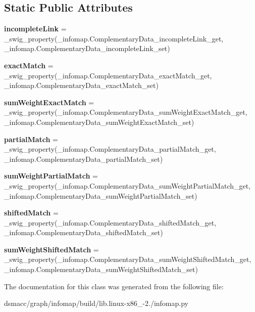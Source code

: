 \subsection*{Static Public Attributes}
\begin{DoxyCompactItemize}
\item 
\mbox{\label{classinfomap_1_1ComplementaryData_aebe64da5d2e6677b2fb473d45c24344f}} 
{\bfseries incomplete\+Link} = \+\_\+swig\+\_\+property(\+\_\+infomap.\+Complementary\+Data\+\_\+incomplete\+Link\+\_\+get, \+\_\+infomap.\+Complementary\+Data\+\_\+incomplete\+Link\+\_\+set)
\item 
\mbox{\label{classinfomap_1_1ComplementaryData_a3b9efed9447db9774af345a5d88b3758}} 
{\bfseries exact\+Match} = \+\_\+swig\+\_\+property(\+\_\+infomap.\+Complementary\+Data\+\_\+exact\+Match\+\_\+get, \+\_\+infomap.\+Complementary\+Data\+\_\+exact\+Match\+\_\+set)
\item 
\mbox{\label{classinfomap_1_1ComplementaryData_a71601654ca46345fca7be3454daa2ded}} 
{\bfseries sum\+Weight\+Exact\+Match} = \+\_\+swig\+\_\+property(\+\_\+infomap.\+Complementary\+Data\+\_\+sum\+Weight\+Exact\+Match\+\_\+get, \+\_\+infomap.\+Complementary\+Data\+\_\+sum\+Weight\+Exact\+Match\+\_\+set)
\item 
\mbox{\label{classinfomap_1_1ComplementaryData_a660f117880967687fab738a1cdfd655f}} 
{\bfseries partial\+Match} = \+\_\+swig\+\_\+property(\+\_\+infomap.\+Complementary\+Data\+\_\+partial\+Match\+\_\+get, \+\_\+infomap.\+Complementary\+Data\+\_\+partial\+Match\+\_\+set)
\item 
\mbox{\label{classinfomap_1_1ComplementaryData_a564489ffab4de9b2f84d8e33a613e0fc}} 
{\bfseries sum\+Weight\+Partial\+Match} = \+\_\+swig\+\_\+property(\+\_\+infomap.\+Complementary\+Data\+\_\+sum\+Weight\+Partial\+Match\+\_\+get, \+\_\+infomap.\+Complementary\+Data\+\_\+sum\+Weight\+Partial\+Match\+\_\+set)
\item 
\mbox{\label{classinfomap_1_1ComplementaryData_aea9d46b2cba186418e8105edc97f4a0c}} 
{\bfseries shifted\+Match} = \+\_\+swig\+\_\+property(\+\_\+infomap.\+Complementary\+Data\+\_\+shifted\+Match\+\_\+get, \+\_\+infomap.\+Complementary\+Data\+\_\+shifted\+Match\+\_\+set)
\item 
\mbox{\label{classinfomap_1_1ComplementaryData_a05575457c192363c40a4e3422d0146c0}} 
{\bfseries sum\+Weight\+Shifted\+Match} = \+\_\+swig\+\_\+property(\+\_\+infomap.\+Complementary\+Data\+\_\+sum\+Weight\+Shifted\+Match\+\_\+get, \+\_\+infomap.\+Complementary\+Data\+\_\+sum\+Weight\+Shifted\+Match\+\_\+set)
\end{DoxyCompactItemize}


The documentation for this class was generated from the following file\+:\begin{DoxyCompactItemize}
\item 
dsmacc/graph/infomap/build/lib.\+linux-\/x86\+\_-\/2./infomap.\+py\end{DoxyCompactItemize}
